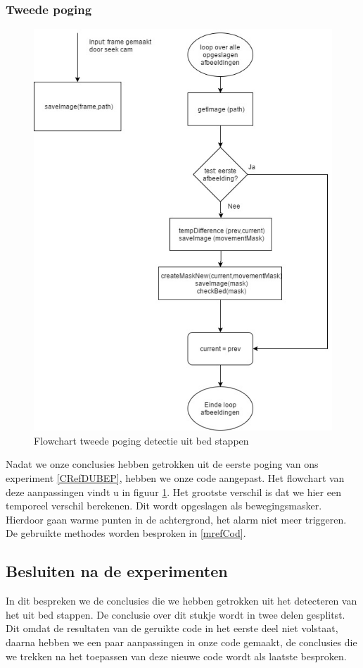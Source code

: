 \subsubsection{Tweede poging}
\label{ERefDUBTP}
\begin{figure}[h]
	\includegraphics[scale=0.45]{FlowChart_DetectUitBed_TweedePoging}
	\caption{Flowchart tweede poging detectie uit bed stappen}
	\label{imgFCDUBTP}
\end{figure}
Nadat we onze conclusies hebben getrokken uit de eerste poging van ons experiment \ref{CRefDUBEP}, hebben we onze code aangepast. Het flowchart van deze aanpassingen vindt u in figuur \ref{imgFCDUBTP}. Het grootste verschil is dat we hier een temporeel verschil berekenen. Dit wordt opgeslagen als bewegingsmasker. Hierdoor gaan warme punten in de achtergrond, het alarm niet meer triggeren. De gebruikte methodes worden besproken in \ref{mrefCod}.

\subsection{Besluiten na de experimenten}
\label{ERefDBB}
In dit bespreken we de conclusies die we hebben getrokken uit het detecteren van het uit bed stappen. De conclusie over dit stukje wordt in twee delen gesplitst. Dit omdat de resultaten van de geruikte code in het eerste deel niet volstaat, daarna hebben we een paar aanpassingen in onze code gemaakt, de conclusies die we trekken na het toepassen van deze nieuwe code wordt als laatste besproken.

